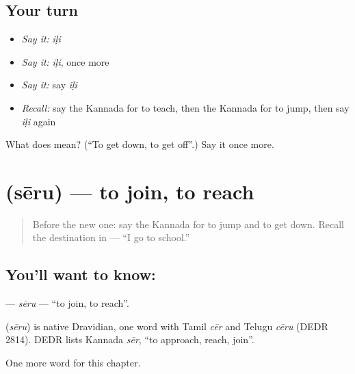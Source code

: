 \subsection*{Your turn}
\begin{itemize}
\raggedright
  \item \emph{Say it:} \emph{iḷi}
  \item \emph{Say it:} \emph{iḷi}, once more
  \item \emph{Say it:} say \emph{iḷi}
  \item \emph{Recall:} say the Kannada for to teach, then the Kannada for to jump, then say \emph{iḷi} again
\end{itemize}

\begin{tcolorbox}[breakable,colback=teal!4,colframe=teal!35!black,title={Before you move on}]
What does  mean? (\textquotedblleft{}To get down, to get off\textquotedblright{}.) Say it once more.
\end{tcolorbox}
\section[\texorpdfstring{\kn{ಸೇರು} (sēru)}{ಸೇರು (sēru)}]{ (sēru) — to join, to reach}

\label{lesson:KA-C149-seru}



\begin{quote}
Before the new one: say the Kannada for to jump and to get down. Recall the destination in \textbf{  } — “I go to school.”
\end{quote}

\subsection*{You'll want to know: }
\textbf{} — \emph{sēru} — \textquotedblleft{}to join, to reach\textquotedblright{}.

\begin{cousinweb}
\textbf{} (\emph{sēru}) is native Dravidian, one word with Tamil \emph{cēr} and Telugu \emph{cēru} (DEDR 2814). DEDR lists Kannada \emph{sēr}, \textquotedblleft{}to approach, reach, join\textquotedblright{}.
\end{cousinweb}

\begin{grammarlens}[title={What you've built}]
One more word for this chapter.
\end{grammarlens}

